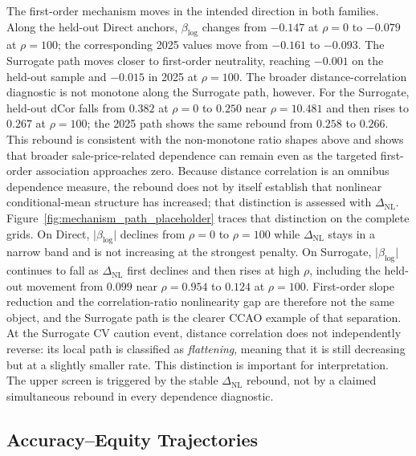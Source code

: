 \documentclass[10pt]{article}
\theoremstyle{definition}
\newcommand{\1}{\mathbf{1}}
\newcommand{\oldtext}[1]{\textcolor{blue}{\sout{#1}}}
\newcommand{\newtext}[1]{\textcolor{impGreen}{#1}}
\newcommand{\latesttext}[1]{\textcolor{latestPurple}{#1}}
\begin{document}
The first-order mechanism moves in the intended direction in both families. Along
the held-out Direct anchors, $\beta_{\log}$ changes from $-0.147$ at
$\rho=0$ to $-0.079$ at $\rho=100$; the corresponding 2025 values move from
$-0.161$ to $-0.093$. The Surrogate path moves closer to first-order neutrality,
reaching $-0.001$ on the held-out sample and $-0.015$ in 2025 at $\rho=100$.
\newtext{The broader distance-correlation diagnostic is not monotone along the Surrogate path, however.} For the Surrogate,
held-out dCor falls from $0.382$ at $\rho=0$ to $0.250$ near
$\rho=10.481$ and then rises to $0.267$ at $\rho=100$; the 2025 path shows
the same rebound from $0.258$ to $0.266$. 
\newtext{This rebound is consistent with the non-monotone ratio shapes above and shows that broader sale-price-related dependence can remain even as the targeted first-order association approaches zero. Because distance correlation is an omnibus dependence measure, the rebound does not by itself establish that nonlinear conditional-mean structure has increased; that distinction is assessed with $\Delta_{\mathrm{NL}}$.}
\newtext{Figure~\ref{fig:mechanism_path_placeholder} traces that distinction on the complete grids. On Direct, $\lvert\beta_{\log}\rvert$ declines from $\rho=0$ to $\rho=100$ while $\Delta_{\mathrm{NL}}$ stays in a narrow band and is not increasing at the strongest penalty. On Surrogate, $\lvert\beta_{\log}\rvert$ continues to fall as $\Delta_{\mathrm{NL}}$ first declines and then rises at high $\rho$, including the held-out movement from $0.099$ near $\rho=0.954$ to $0.124$ at $\rho=100$. First-order slope reduction and the correlation-ratio nonlinearity gap are therefore not the same object, and the Surrogate path is the clearer CCAO example of that separation.}
\latesttext{At the Surrogate CV caution event, distance correlation does not independently reverse: its local path is classified as \emph{flattening}, meaning that it is still decreasing but at a slightly smaller rate. This distinction is important for interpretation. The upper screen is triggered by the stable $\Delta_{\mathrm{NL}}$ rebound, not by a claimed simultaneous rebound in every dependence diagnostic.}

\subsection{Accuracy--Equity Trajectories}
\label{subsec:tradeoff_results}
\end{document}
